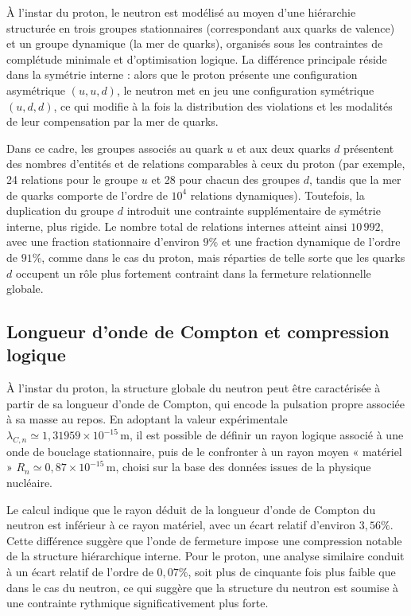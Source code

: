 \documentclass[11pt,a4paper]{article}
\begin{document}
À l’instar du proton, le neutron est modélisé au moyen d’une hiérarchie structurée en trois groupes stationnaires (correspondant aux quarks de valence) et un groupe dynamique (la mer de quarks), organisés sous les contraintes de complétude minimale et d’optimisation logique. La différence principale réside dans la symétrie interne : alors que le proton présente une configuration asymétrique \(\left(u,u,d\right)\), le neutron met en jeu une configuration symétrique \(\left(u,d,d\right)\), ce qui modifie à la fois la distribution des violations et les modalités de leur compensation par la mer de quarks. 

Dans ce cadre, les groupes associés au quark \(u\) et aux deux quarks \(d\) présentent des nombres d’entités et de relations comparables à ceux du proton (par exemple, 24 relations pour le groupe \(u\) et 28 pour chacun des groupes \(d\), tandis que la mer de quarks comporte de l’ordre de \(10^{4}\) relations dynamiques). Toutefois, la duplication du groupe \(d\) introduit une contrainte supplémentaire de symétrie interne, plus rigide. Le nombre total de relations internes atteint ainsi \(10\,992\), avec une fraction stationnaire d’environ \(9\%\) et une fraction dynamique de l’ordre de \(91\%\), comme dans le cas du proton, mais réparties de telle sorte que les quarks \(d\) occupent un rôle plus fortement contraint dans la fermeture relationnelle globale.

\subsection{Longueur d’onde de Compton et compression logique}

À l’instar du proton, la structure globale du neutron peut être caractérisée à partir de sa longueur d’onde de Compton, qui encode la pulsation propre associée à sa masse au repos. En adoptant la valeur expérimentale \(\lambda_{C,n} \simeq 1{,}31959\times 10^{-15}\,\mathrm{m}\), il est possible de définir un rayon logique associé à une onde de bouclage stationnaire, puis de le confronter à un rayon moyen « matériel » \(R_n \simeq 0{,}87\times 10^{-15}\,\mathrm{m}\), choisi sur la base des données issues de la physique nucléaire. 

Le calcul indique que le rayon déduit de la longueur d’onde de Compton du neutron est inférieur à ce rayon matériel, avec un écart relatif d’environ \(3{,}56\%\). Cette différence suggère que l’onde de fermeture impose une compression notable de la structure hiérarchique interne. Pour le proton, une analyse similaire conduit à un écart relatif de l’ordre de \(0{,}07\%\), soit plus de cinquante fois plus faible que dans le cas du neutron, ce qui suggère que la structure du neutron est soumise à une contrainte rythmique significativement plus forte.
\end{document}
